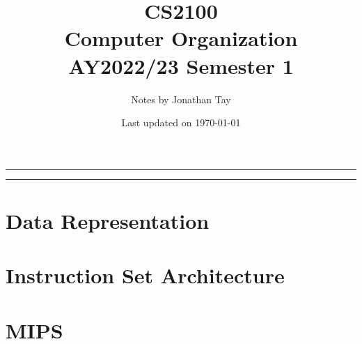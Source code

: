 \documentclass{article}
\title{\vspace{-1cm}\textbf{CS2100 \\[0.25em] Computer Organization} \\[2em] \Large AY2022/23 Semester 1 \\[1em]}
\author{Notes by Jonathan Tay}
\date{Last updated on \today}
\newcommand{\pageline}[1]{\par\noindent\rule{\textwidth}{#1}} %
\begin{document}
    \linespread{1.4}\selectfont
    \maketitle
    \pageline{1.5pt}
    \tableofcontents
    \pageline{1.5pt}
    \linespread{1.08}\selectfont

    \newpage
    \begin{multicols*}{2}
        \part{Data Representation}
            
        \part{Instruction Set Architecture}
            
        \part{MIPS}
            
            
            
    \end{multicols*}
\end{document}
